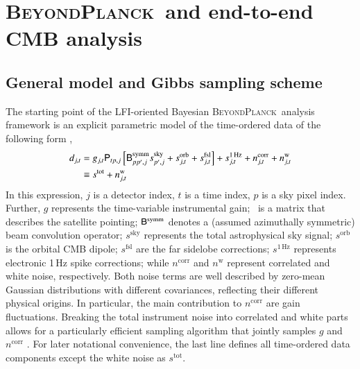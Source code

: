 \documentclass[twocolumn]{aa}
\newcommand{\red}[0]{\color{red}}
\newcommand{\B}[0]{\tens{B}}
\renewcommand{\P}[0]{\tens{P}}
\newcommand{\BP}{\textsc{BeyondPlanck}}
\begin{document}
\section{\BP\ and end-to-end CMB analysis}
\label{sec:bp}

\subsection{General model and Gibbs sampling scheme}

The starting point of the LFI-oriented Bayesian \BP\ analysis framework is an
explicit parametric model of the time-ordered data of the following
form \citep{bp01},
\begin{align}
    d_{j,t} &= g_{j,t} \P_{tp,j}\left[\B^{\mathrm{symm}}_{pp',j} s^{\mathrm{sky}}_{p',j}  + s^{\mathrm{orb}}_{j,t}  
      + s^{\mathrm{fsl}}_{j,t}\right] 
    + s^{\mathrm{1\,Hz}}_{j,t} + n^{\mathrm{corr}}_{j,t} +
    n^{\mathrm{w}}_{j,t}\\
    &\equiv s^{\mathrm{tot}} + n^{\mathrm{w}}_{j,t}
  \label{eq:todmodel}
\end{align}
In this expression, $j$ is a detector index, $t$ is a time index, $p$
is a sky pixel index. Further, $g$ represents the time-variable
instrumental gain; \P\ is a matrix that describes the satellite
pointing; $\B^{\mathrm{symm}}$ denotes a (assumed azimuthally
symmetric) beam convolution operator; $s^{\mathrm{sky}}$ represents
the total astrophysical sky signal; $s^{\mathrm{orb}}$ is the orbital
CMB dipole; $s^{\mathrm{fsl}}$ are the far sidelobe corrections;
$s^{\mathrm{1\,Hz}}$ represents electronic 1\,Hz spike corrections;
{\red while $n^{\mathrm{corr}}$ and $n^{\mathrm{w}}$ represent
correlated and white noise, respectively. Both noise terms are well described by zero-mean Gaussian distributions with different covariances, reflecting their different physical origins. In particular, the main contribution to $n^{\mathrm{corr}}$ are gain fluctuations. Breaking the total instrument noise into correlated and white parts allows for a particularly efficient sampling algorithm that jointly samples $g$ and $n^{\mathrm{corr}}$ \citep{bp01,bp06}.} For later notational convenience, the
last line defines all time-ordered data components except the white
noise as $s^{\mathrm{tot}}$.
\end{document}
